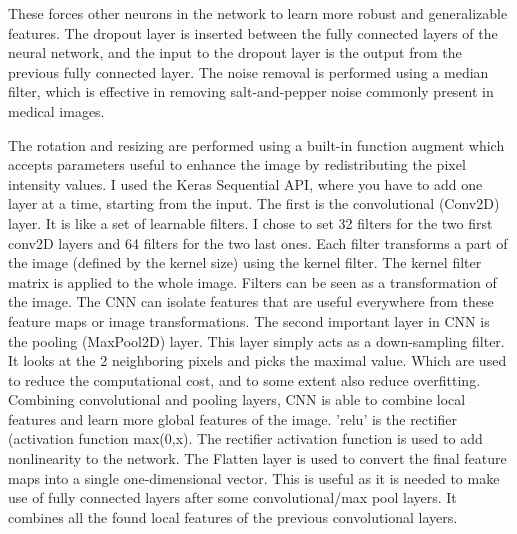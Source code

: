 \documentclass[twocolumn]{article}
\begin{document}
These forces other neurons in the network to learn more robust and generalizable features.
The dropout layer is inserted between the fully connected layers of the neural network, and the input to the dropout layer is the output from the previous fully connected layer.
The noise removal is performed using a median filter, which is effective in removing salt-and-pepper noise commonly present in medical images. 

The rotation and resizing are performed using a built-in function augment which accepts parameters useful to enhance the image by redistributing the pixel intensity values. 
I used the Keras Sequential API, where you have to add one layer at a time, starting from the input. The first is the convolutional (Conv2D) layer. It is like a set of learnable filters. I chose to set 32 filters for the two first conv2D layers and 64 filters for the two last ones. Each filter transforms a part of the image (defined by the kernel size) using the kernel filter. The kernel filter matrix is applied to the whole image. Filters can be seen as a transformation of the image. The CNN can isolate features that are useful everywhere from these feature maps or image transformations.
The second important layer in CNN is the pooling (MaxPool2D) layer. This layer simply acts as a down-sampling filter. It looks at the 2 neighboring pixels and picks the maximal value. Which are used to reduce the computational cost, and to some extent also reduce overfitting. 
Combining convolutional and pooling layers, CNN is able to combine local features and learn more global features of the image.
'relu' is the rectifier (activation function max(0,x). The rectifier activation function is used to add nonlinearity to the network.
The Flatten layer is used to convert the final feature maps into a single one-dimensional vector. This is useful as it is needed to make use of fully connected layers after some convolutional/max pool layers. It combines all the found local features of the previous convolutional layers.

\newcommand{\grad}{\nabla_\theta L(\theta)}
\newcommand{\mt}{m_t}
\newcommand{\vt}{v_t}
\newcommand{\mhat}{\hat{m}_t}
\newcommand{\vhat}{\hat{v}_t}
\newcommand{\eps}{\epsilon}
\newcommand{\lr}{\alpha}
\newcommand{\betaone}{\beta_1}
\newcommand{\betatwo}{\beta_2}
\end{document}
